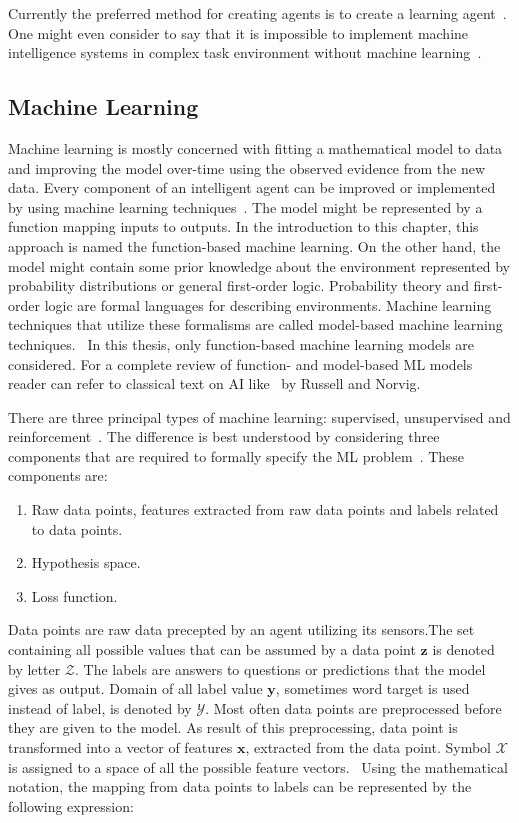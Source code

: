 \documentclass[english, 12pt, a4paper, elec, utf8, online]{aaltothesis}
\begin{document}
Currently the preferred method for creating agents is to create a learning agent~\cite{AIMA}. One might even consider to say that it is impossible to implement machine intelligence systems in complex task environment without machine learning~\cite{Jung2018}.         

\subsection{Machine Learning}
Machine learning is mostly concerned with fitting a mathematical model to data and improving the model over-time using the observed evidence from the new data. Every component of an intelligent agent can be improved or implemented by using machine learning techniques~\cite{AIMA}. The model might be represented by a function mapping inputs to outputs. In the introduction to this chapter, this approach is named the function-based machine learning. On the other hand, the model might contain some prior knowledge about the environment represented by probability distributions or general first-order logic. Probability theory and first-order logic are formal languages for describing environments. Machine learning techniques that utilize these formalisms are called model-based machine learning techniques.~\cite{Jung2018, AIMA, Darwiche17} In this thesis, only function-based machine learning models are considered. For a complete review of function- and model-based ML models reader can refer to classical text on AI like~\cite{AIMA} by Russell and Norvig.

There are three principal types of machine learning: supervised, unsupervised and reinforcement~\cite{AIMA}. The difference is best understood by considering three components that are required to formally specify the ML problem~\cite{Jung2018}. These components are:
\begin{enumerate}
\item
Raw data points, features extracted from raw data points and labels related to data points.
\item 
Hypothesis space.
\item
Loss function.
\end{enumerate}

Data points are raw data precepted by an agent utilizing its sensors.The set containing all possible values that can be assumed by a data point $\mathbf{z}$ is denoted by letter $\mathcal{Z}$. The labels are answers to questions or predictions that the model gives as output. Domain of all label value $\mathbf{y}$, sometimes word target is used instead of label, is denoted by $\mathcal{Y}$. Most often data points are preprocessed before they are given to the model. As result of this preprocessing, data point is transformed into a vector of features $\mathbf{x}$, extracted from the data point. Symbol $\mathcal{X}$ is assigned to a space of all the possible feature vectors.~\cite{Jung2018} Using the mathematical notation, the mapping from data points to labels can be represented by the following expression:
\end{document}

